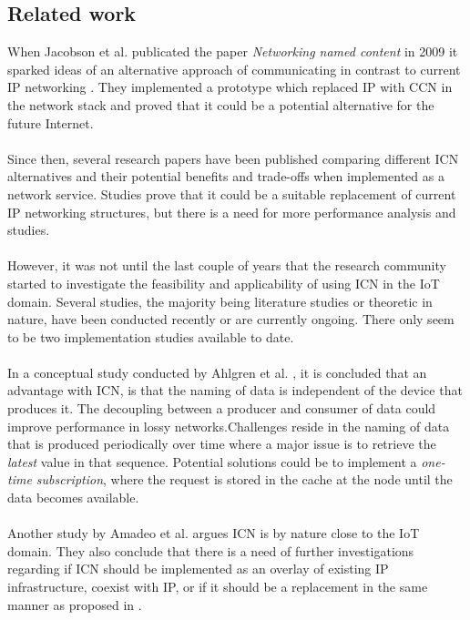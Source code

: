 \subsection{Related work}
When Jacobson et al. publicated the paper \textit{Networking named content} in 2009 it sparked ideas of an alternative approach of communicating in contrast to current IP networking \cite{Jacobson2009}. They implemented a prototype which replaced IP with CCN in the network stack and proved that it could be a potential alternative for the future Internet.\\\\
Since then, several research papers have been published comparing different ICN alternatives and their potential benefits and trade-offs when implemented as a network service\cite{Ahlgren2012}. Studies prove that it could be a suitable replacement of current IP networking structures, but there is a need for more performance analysis and studies\cite{Ahlgren2012}\cite{Greek-ICN-networking-survey-2014}.\\\\
However, it was not until the last couple of years that the research community started to investigate the feasibility and applicability of using ICN in the IoT domain. Several studies, the majority being literature studies or theoretic in nature, have been conducted recently or are currently ongoing. There only seem to be two implementation studies available to date.\\\\
In a conceptual study conducted by Ahlgren et al. \cite{Ahlgreniot}, it is concluded that an advantage with ICN, is that the naming of data is independent of the device that produces it. The decoupling between a producer and consumer of data could improve performance in lossy networks.Challenges reside in the naming of data that is produced periodically over time where a major issue is to retrieve the \textit{latest} value in that sequence.  Potential solutions could be to implement a \textit{one-time subscription}, where the request is stored in the cache at the node until the data becomes available\cite{Ahlgreniot}.\\\\
Another study by Amadeo et al. \cite{iotchop} argues ICN is by nature close to the IoT domain. They also conclude that there is a need of further investigations regarding if ICN should be implemented as an overlay of existing IP infrastructure, coexist with IP, or if it should be a replacement in the same manner as proposed in \cite{Jacobson2009}.\\\\

